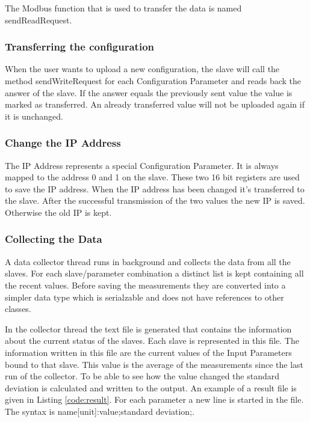 The Modbus function that is used to transfer the data is named sendReadRequest.

\subsubsection{Transferring the configuration} %
\label{ssub:transferring_the_configuration}
When the user wants to upload a new configuration, the slave will call the method sendWriteRequest for each Configuration Parameter and reads back the answer of the slave. If the answer equals the previously sent value the value is marked as transferred. An already transferred value will not be uploaded again if it is unchanged.
\subsubsection{Change the IP Address} %
\label{ssub:change_the_ip_address}
The IP Address represents a special Configuration Parameter. It is always mapped to the address 0 and 1 on the slave. These two 16 bit registers are used to save the IP address. When the IP address has been changed it's transferred to the slave. After the successful transmission of the two values the new IP is saved. Otherwise the old IP is kept.


\subsubsection{Collecting the Data} %
\label{ssub:collecting_the_data}
A data collector thread runs in background and collects the data from all the slaves. For each slave/parameter combination a distinct list is kept containing all the recent values. Before saving the measurements they are converted into a simpler data type which is serialzable and does not have references to other classes.

In the collector thread the text file is generated that contains the information about the current status of the slaves. Each slave is represented in this file. The information written in this file are the current values of the Input Parameters bound to that slave. This value is the average of the measurements since the last run of the collector. To be able to see how the value changed the standard deviation is calculated and written to the output. An example of a result file is given in Listing \ref{code:result}. 
For each parameter a new line is started in the file. The syntax is {\C name[unit]:value;standard deviation;}.

